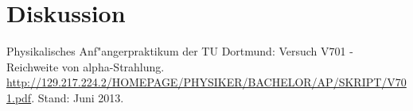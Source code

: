 \section{Diskussion}
\label{sec:diskussion}

\begin{thebibliography}{9}
	 Physikalisches Anf"angerpraktikum der TU Dortmund: Versuch V701 - Reichweite von alpha-Strahlung. \url{http://129.217.224.2/HOMEPAGE/PHYSIKER/BACHELOR/AP/SKRIPT/V701.pdf}. Stand: Juni 2013.
\end{thebibliography}
